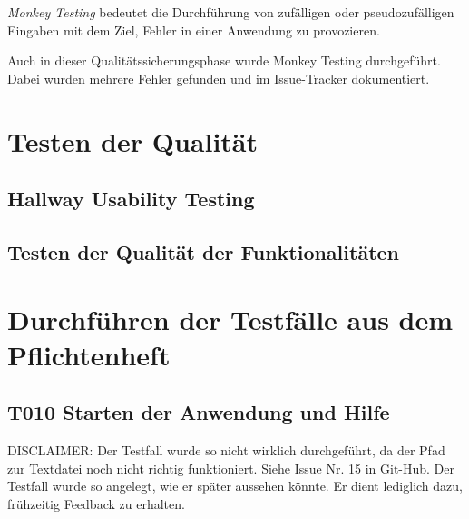 \documentclass[parskip=full]{scrartcl}
\begin{document}
\textit{Monkey Testing} bedeutet die Durchführung von zufälligen oder pseudozufälligen Eingaben mit dem Ziel, Fehler in einer Anwendung zu provozieren.

Auch in dieser Qualitätssicherungsphase wurde Monkey Testing durchgeführt. Dabei wurden mehrere Fehler gefunden und im Issue-Tracker dokumentiert.






\clearpage
\section{Testen der Qualität} \label{quali}



\subsection{Hallway Usability Testing}


\subsection{Testen der Qualität der Funktionalitäten}



\section{Durchführen der Testfälle aus dem Pflichtenheft} \label{testszenarien}

\subsection{\textbf{T010} Starten der Anwendung und Hilfe}

DISCLAIMER: Der Testfall wurde so nicht wirklich durchgeführt, da der Pfad zur Textdatei noch nicht richtig funktioniert. Siehe Issue Nr. 15 in Git-Hub. Der Testfall wurde so angelegt, wie er später aussehen könnte. Er dient lediglich dazu, frühzeitig Feedback zu erhalten.
\end{document}
